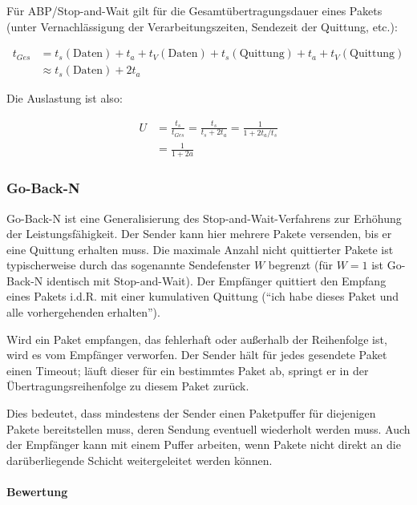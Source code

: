 \documentclass[a4paper, 14pt]{article}
\begin{document}
	Für ABP/Stop-and-Wait gilt für die Gesamtübertragungsdauer eines Pakets (unter Vernachlässigung der Verarbeitungszeiten, Sendezeit der Quittung, etc.):

	\begin{align*}
		t_{Ges} &= t_s(\text{Daten}) + t_a + t_V(\text{Daten}) + t_s(\text{Quittung}) + t_a + t_V(\text{Quittung}) \\
		&\approx t_s(\text{Daten}) + 2t_a
	\end{align*}

	Die Auslastung ist also:

	\begin{align*}
		U &= \frac{t_s}{t_{Ges}} = \frac{t_s}{t_s + 2t_a} = \frac{1}{1 + 2t_a/t_s} \\
		&= \frac{1}{1 + 2a}
	\end{align*}


	\subsubsection{Go-Back-N}

	Go-Back-N ist eine Generalisierung des Stop-and-Wait-Verfahrens zur Erhöhung der Leistungsfähigkeit.
	Der Sender kann hier mehrere Pakete versenden, bis er eine Quittung erhalten muss.
	Die maximale Anzahl nicht quittierter Pakete ist typischerweise durch das sogenannte Sendefenster $W$ begrenzt (für $W = 1$ ist Go-Back-N identisch mit Stop-and-Wait).
	Der Empfänger quittiert den Empfang eines Pakets i.d.R. mit einer kumulativen Quittung (\enquote{ich habe dieses Paket und alle vorhergehenden erhalten}).
	
	Wird ein Paket empfangen, das fehlerhaft oder außerhalb der Reihenfolge ist, wird es vom Empfänger verworfen.
	Der Sender hält für jedes gesendete Paket einen Timeout; läuft dieser für ein bestimmtes Paket ab, springt er in der Übertragungsreihenfolge zu diesem Paket zurück.

	Dies bedeutet, dass mindestens der Sender einen Paketpuffer für diejenigen Pakete bereitstellen muss, deren Sendung eventuell wiederholt werden muss.
	Auch der Empfänger kann mit einem Puffer arbeiten, wenn Pakete nicht direkt an die darüberliegende Schicht weitergeleitet werden können.

	\paragraph{Bewertung}
\end{document}
